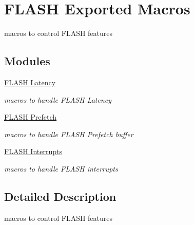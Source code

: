 \hypertarget{group___f_l_a_s_h___exported___macros}{}\section{F\+L\+A\+SH Exported Macros}
\label{group___f_l_a_s_h___exported___macros}


macros to control F\+L\+A\+SH features  


\subsection*{Modules}
\begin{DoxyCompactItemize}
\item 
\hyperlink{group___f_l_a_s_h___e_m___latency}{F\+L\+A\+S\+H Latency}
\begin{DoxyCompactList}\small\item\em macros to handle F\+L\+A\+SH Latency \end{DoxyCompactList}\item 
\hyperlink{group___f_l_a_s_h___prefetch}{F\+L\+A\+S\+H Prefetch}
\begin{DoxyCompactList}\small\item\em macros to handle F\+L\+A\+SH Prefetch buffer \end{DoxyCompactList}\item 
\hyperlink{group___f_l_a_s_h___interrupt}{F\+L\+A\+S\+H Interrupts}
\begin{DoxyCompactList}\small\item\em macros to handle F\+L\+A\+SH interrupts \end{DoxyCompactList}\end{DoxyCompactItemize}


\subsection{Detailed Description}
macros to control F\+L\+A\+SH features 

